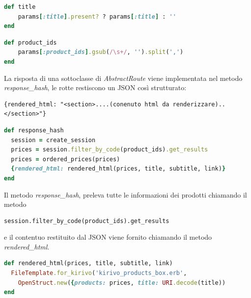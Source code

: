 \begin{lstlisting}[language=Ruby,caption={Il metodo \emph{title} che preleva il parametro \emph{title} se presente}] 
def title
    params[:title].present? ? params[:title] : ''
end
\end{lstlisting}

\begin{lstlisting}[language=Ruby,caption={Il metodo \emph{product\_ids} trasforma gli ids passati nel parametro in un array}] 
def product_ids
    params[:product_ids].gsub(/\s+/, '').split(',')
end
\end{lstlisting}

La risposta di una sottoclasse di \emph{AbstractRoute} viene implementata nel metodo \emph{response\_hash}, le rotte restiscono un JSON
così strutturato:
\begin{verbatim}
{rendered_html: "<section>....(conenuto html da renderizzare)..</section>"}
\end{verbatim}

\begin{lstlisting}[language=Ruby,caption={Il metodo \emph{response\_hash} dove viene creato il JSON da restituire}] 
def response_hash
  session = create_session
  prices = session.filter_by_code(product_ids).get_results
  prices = ordered_prices(prices)
  {rendered_html: rendered_html(prices, title, subtitle, link)}
end
\end{lstlisting}

Il metodo \emph{response\_hash}, preleva tutte le informazioni dei prodotti chiamando il metodo
\begin{verbatim}
session.filter_by_code(product_ids).get_results
\end{verbatim}
e il contentuo restituito dal JSON viene fornito chiamando il metodo \emph{rendered\_html}.

\begin{lstlisting}[language=Ruby,caption={Il metodo \emph{rendered\_html} restituisce il contenuto dell'erb compilato con i parametri passati con la chiamata FileTemplate.for\_kirivo}] 
def rendered_html(prices, title, subtitle, link)
  FileTemplate.for_kirivo('kirivo_products_box.erb', 
    OpenStruct.new({products: prices, title: URI.decode(title))
end
\end{lstlisting}

